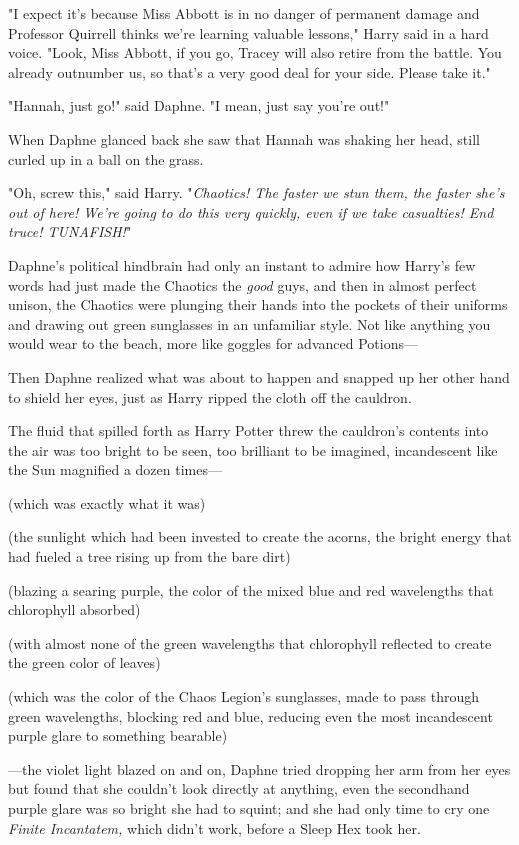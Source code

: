 "I expect it's because Miss Abbott is in no danger of permanent damage and
Professor Quirrell thinks we're learning valuable lessons," Harry said in a
hard voice. "Look, Miss Abbott, if you go, Tracey will also retire from the
battle. You already outnumber us, so that's a very good deal for your side.
Please take it."

"Hannah, just go!" said Daphne. "I mean, just say you're out!"

When Daphne glanced back she saw that Hannah was shaking her head, still curled
up in a ball on the grass.

"Oh, screw this," said Harry. "\emph{Chaotics! The faster we stun them, the
faster she's out of here! We're going to do this very quickly, even if we take
casualties! End truce! TUNAFISH!}"

Daphne's political hindbrain had only an instant to admire how Harry's few
words had just made the Chaotics the \emph{good} guys, and then in almost
perfect unison, the Chaotics were plunging their hands into the pockets of
their uniforms and drawing out green sunglasses in an unfamiliar style. Not
like anything you would wear to the beach, more like goggles for advanced
Potions---

Then Daphne realized what was about to happen and snapped up her other hand to
shield her eyes, just as Harry ripped the cloth off the cauldron.

The fluid that spilled forth as Harry Potter threw the cauldron's contents into
the air was too bright to be seen, too brilliant to be imagined, incandescent
like the Sun magnified a dozen times---

(which was exactly what it was)

(the sunlight which had been invested to create the acorns, the bright energy
that had fueled a tree rising up from the bare dirt)

(blazing a searing purple, the color of the mixed blue and red wavelengths that
chlorophyll absorbed)

(with almost none of the green wavelengths that chlorophyll reflected to create
the green color of leaves)

(which was the color of the Chaos Legion's sunglasses, made to pass through
green wavelengths, blocking red and blue, reducing even the most incandescent
purple glare to something bearable)

---the violet light blazed on and on, Daphne tried dropping her arm from her
eyes but found that she couldn't look directly at anything, even the secondhand
purple glare was so bright she had to squint; and she had only time to cry one
\emph{Finite Incantatem,} which didn't work, before a Sleep Hex took her.

